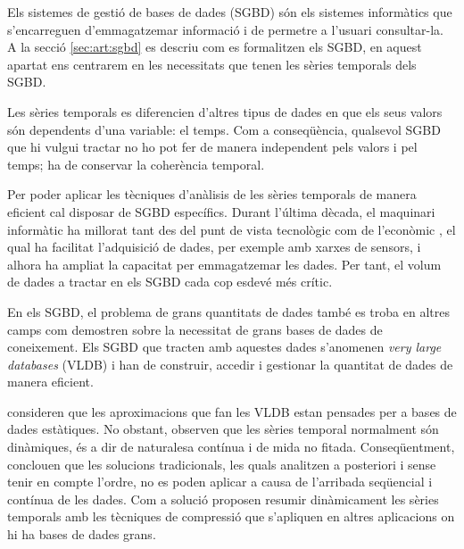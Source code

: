 Els sistemes de gestió de bases de dades (SGBD) són els sistemes informàtics que s'encarreguen d'emmagatzemar informació i de permetre a l'usuari consultar-la. A la secció \ref{sec:art:sgbd} es descriu com es formalitzen els SGBD, en aquest apartat ens centrarem en les necessitats que tenen les sèries temporals dels SGBD.


Les sèries temporals es diferencien d'altres tipus de dades en que els seus valors són dependents d'una variable: el temps. Com a conseqüència, qualsevol SGBD que hi vulgui tractar no ho pot fer de manera independent pels valors i pel temps; ha de conservar la coherència temporal.

Per poder aplicar les tècniques d'anàlisis de les sèries temporals de manera eficient cal disposar de SGBD específics. 
Durant l'última dècada, el maquinari informàtic ha millorat tant des del punt de vista tecnològic com de l'econòmic \parencite{deligiannakis07}, el qual ha facilitat l'adquisició de dades, per exemple amb xarxes de sensors, i alhora ha ampliat la capacitat per emmagatzemar les dades. 
Per tant, el volum de dades a tractar  en els SGBD cada cop esdevé més crític.

 
En els SGBD, el problema de grans quantitats de dades també es troba en altres camps com demostren \textcite{mylopoulos96} sobre la necessitat de grans bases de dades de coneixement. Els SGBD que tracten amb aquestes dades s'anomenen \emph{very large databases} (VLDB) i han de construir, accedir i gestionar la quantitat de dades de manera eficient.

\textcite{ogras06} consideren que les aproximacions que fan les VLDB
estan pensades per a bases de dades estàtiques. No obstant, observen
que les sèries temporal normalment són dinàmiques, és a dir de
naturalesa contínua i de mida no fitada. Conseqüentment, conclouen que
les solucions tradicionals, les quals analitzen a posteriori i sense
tenir en compte l'ordre, no es poden aplicar a causa de l'arribada
seqüencial i contínua de les dades.  Com a solució proposen resumir
dinàmicament les sèries temporals amb les tècniques de compressió que
s'apliquen en altres aplicacions on hi ha bases de dades grans.




